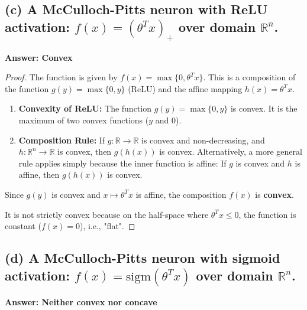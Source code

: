 \documentclass{article}
\begin{document}
\subsection*{(c) A McCulloch-Pitts neuron with ReLU activation: $f(x) = (\theta^T x)_+$ over domain $\mathbb{R}^n$.}

\textbf{Answer: Convex}

\begin{proof}
The function is given by $f(x) = \max\{0, \theta^T x\}$.
This is a composition of the function $g(y) = \max\{0, y\}$ (ReLU) and the affine mapping $h(x) = \theta^T x$.

\begin{enumerate}
    \item \textbf{Convexity of ReLU:} The function $g(y) = \max\{0, y\}$ is convex. It is the maximum of two convex functions ($y$ and $0$).
    \item \textbf{Composition Rule:} If $g: \mathbb{R} \to \mathbb{R}$ is convex and non-decreasing, and $h: \mathbb{R}^n \to \mathbb{R}$ is convex, then $g(h(x))$ is convex. Alternatively, a more general rule applies simply because the inner function is affine: If $g$ is convex and $h$ is affine, then $g(h(x))$ is convex.
\end{enumerate}

Since $g(y)$ is convex and $x \mapsto \theta^T x$ is affine, the composition $f(x)$ is \textbf{convex}.

It is not strictly convex because on the half-space where $\theta^T x \le 0$, the function is constant ($f(x) = 0$), i.e., "flat".
\end{proof}

\subsection*{(d) A McCulloch-Pitts neuron with sigmoid activation: $f(x) = \text{sigm}(\theta^T x)$ over domain $\mathbb{R}^n$.}

\textbf{Answer: Neither convex nor concave}
\end{document}
